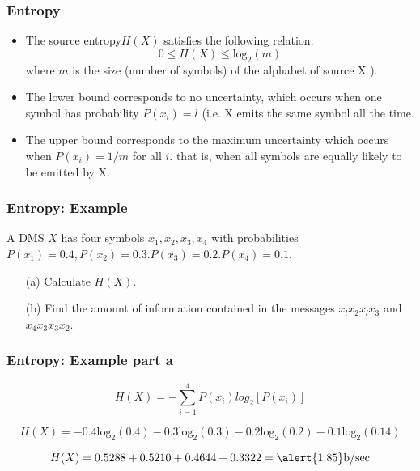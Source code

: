\documentclass[a4]{beamer}
\begin{document}
\begin{frame}
\frametitle{Entropy}
\begin{itemize}
\item The source entropy$ H(X)$ satisfies the following relation:
\[0 \leq H(X) \leq \mbox{log}_2(m) \]where $m$ is the size (number of symbols) of the alphabet of source X ).
\item  The lower bound corresponds to no uncertainty, which occurs when one symbol has probability $P(x_i) = l$ (i.e. X emits the same symbol all the time.
\item The upper bound corresponds to the maximum uncertainty which occurs when $P(x_i) = 1 /m$ for all $i$. that is, when all symbols are equally likely to be emitted by X.
\end{itemize}
\end{frame}


\begin{frame}
\frametitle{Entropy: Example}
A DMS $X$ has four symbols $x_1 , x_2, x_3, x_4$ with probabilities $P(x_1) = 0.4, P(x_2) = 0.3. P(x_3) = 0.2.
P(x_4) = 0.1$.
\begin{itemize}
\item[(a)] Calculate $H(X)$.
\item[(b)] Find the amount of information contained in the messages $x_lx_2x_lx_3$ and $x_4x_3x_3x_2$.
\end{itemize}
\end{frame}

\begin{frame}
\frametitle{Entropy: Example part a}

\[ H(X) = - \sum \limits^{4}_{i=1} P(x_i) log_2 [P(x_i)] \]

\[ H(X) = -0.4\mbox{log}_2(0.4) - 0.3\mbox{log}_2(0.3)  -0.2\mbox{log}_2(0.2)  -0.1\mbox{log}_2(0.14) \]



\[ H(X) =  0.5288 + 0.5210 + 0.4644 + 0.3322  = \alert{1.85} \mbox{b/sec} \]

\end{frame}
\end{document}
